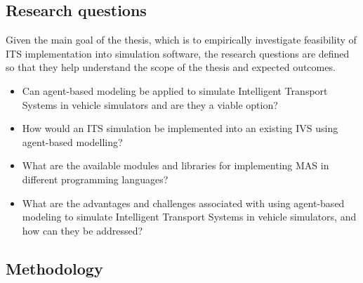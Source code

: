 \documentclass[titlepage, 12pt]{article}
\begin{document}
 \subsection{Research questions}

Given the main goal of the thesis, which is to empirically investigate feasibility of ITS implementation into 
simulation software, the research questions are defined so that they help understand the scope of the thesis and 
expected outcomes. 


\begin{itemize}
    \item Can agent-based modeling be applied to simulate Intelligent Transport Systems in vehicle simulators and are they a viable option?
    \item How would an ITS simulation be implemented into an existing IVS using agent-based modelling?
    \item What are the available modules and libraries for implementing MAS in different programming languages?
    \item What are the advantages and challenges associated with using agent-based modeling to simulate Intelligent Transport Systems in vehicle simulators, and how can they be addressed?
\end{itemize}


\subsection{Methodology}
\end{document}
